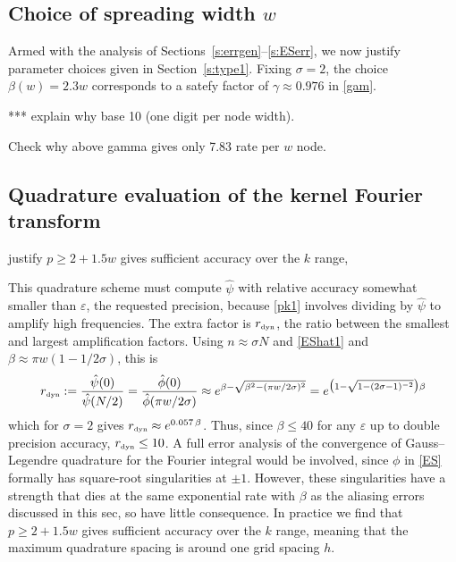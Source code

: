 \documentclass[10pt]{article}
\newcommand{\be}{\begin{equation}}
\newcommand{\ee}{\end{equation}}
\newcommand{\tbox}[1]{{\mbox{\tiny #1}}}
\newcommand{\eps}{\varepsilon}
\newcommand{\freq}{\beta}          %
\newcommand{\rat}{\sigma}          %
\newcommand{\rmax}{r_\tbox{dyn}}    %
\begin{document}
\subsection{Choice of spreading width $w$}
\label{s:w}

Armed with the analysis of Sections~\ref{s:errgen}--\ref{s:ESerr},
we now justify parameter choices given in Section~\ref{s:type1}.
Fixing $\rat=2$, the choice $\freq(w) = 2.3 w$
corresponds to a satefy factor of $\gamma \approx 0.976$
in \eqref{gam}.

*** explain why base 10 (one digit per node width).

Check why above gamma gives only 7.83 rate per $w$ node.



\subsection{Quadrature evaluation of the kernel Fourier transform}
\label{s:p}

justify  $p\ge 2+1.5 w$ gives sufficient accuracy
over the $k$ range,

This quadrature scheme must compute $\hat\psi$
with relative accuracy
somewhat smaller than $\eps$, the requested precision,
because \eqref{pk1} involves dividing by $\hat\psi$ to amplify
high frequencies.
The extra factor is $\rmax$, the ratio between the smallest and largest
amplification factors. Using $n\approx \rat N$ and
\eqref{EShat1} and $\beta \approx \pi w( 1- 1/2\rat)$,
this is
\be
\rmax := \frac{\hat\psi(0)}{\hat\psi(N/2)}
= \frac{\hat\phi(0)}{\hat\phi(\pi w/2\rat)}
\approx e^{\freq - \sqrt{\freq^2 - (\pi w/2\rat)^2}}
= e^{\bigl(1 - \sqrt{1-(2\rat-1)^{-2}}\bigr)\freq}
\label{rmax}
\ee
which for $\rat=2$ gives $\rmax \approx e^{0.057\,\freq}$.
Thus, since $\beta\le40$ for any $\eps$
up to double precision accuracy, $\rmax\le 10$.
A full error analysis of the convergence of Gauss--Legendre quadrature
for the Fourier integral would be involved, since $\phi$ in \eqref{ES}
formally has square-root singularities at $\pm 1$.
However, these singularities have a strength that dies at the same
exponential rate with $\freq$
as the aliasing errors discussed in this sec, so have
little consequence.
In practice we find that $p\ge 2+1.5 w$ gives sufficient accuracy
over the $k$ range,
meaning that the maximum quadrature spacing is around one
grid spacing $h$.
\end{document}
